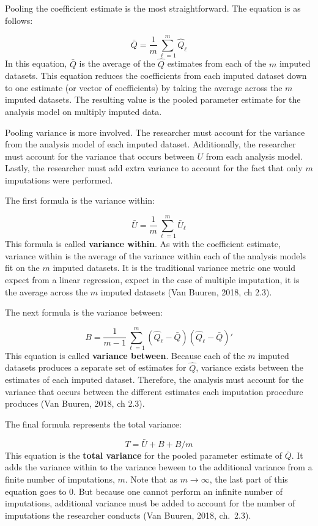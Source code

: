 \documentclass[12pt,oneside]{chicagocapstone}
\begin{document}
Pooling the coefficient estimate is the most straightforward. The
equation is as follows:

\[\bar Q = \frac{1}{m}\sum_{\ell=1}^m \hat Q_\ell\] In this equation,
\(\bar Q\) is the average of the \(\hat Q\) estimates from each of the
\(m\) imputed datasets. This equation reduces the coefficients from each
imputed dataset down to one estimate (or vector of coefficients) by
taking the average across the \(m\) imputed datasets. The resulting
value is the pooled parameter estimate for the analysis model on
multiply imputed data.

Pooling variance is more involved. The researcher must account for the
variance from the analysis model of each imputed dataset. Additionally,
the researcher must account for the variance that occurs between \(U\)
from each analysis model. Lastly, the researcher must add extra variance
to account for the fact that only \(m\) imputations were performed.

The first formula is the variance within:

\[ \bar U = \frac{1}{m}\sum_{\ell=1}^m \bar U_\ell\] This formula is
called \textbf{variance within}. As with the coefficient estimate,
variance within is the average of the variance within each of the
analysis models fit on the \(m\) imputed datasets. It is the traditional
variance metric one would expect from a linear regression, expect in the
case of multiple imputation, it is the average across the \(m\) imputed
datasets (Van Buuren, 2018, ch 2.3).

The next formula is the variance between:

\[B = \frac{1}{m-1}\sum_{\ell=1}^m (\hat Q_\ell-\bar Q)(\hat Q_\ell-\bar Q)'\]
This equation is called \textbf{variance between}. Because each of the
\(m\) imputed datasets produces a separate set of estimates for
\(\hat Q\), variance exists between the estimates of each imputed
dataset. Therefore, the analysis must account for the variance that
occurs between the different estimates each imputation procedure
produces (Van Buuren, 2018, ch 2.3).

The final formula represents the total variance:

\[T = \bar U + B + B/m\] This equation is the \textbf{total variance}
for the pooled parameter estimate of \(\bar Q\). It adds the variance
within to the variance beween to the additional variance from a finite
number of imputations, \(m\). Note that as \(m \rightarrow \infty\), the
last part of this equation goes to \(0\). But because one cannot perform
an infinite number of imputations, additional variance must be added to
account for the number of imputations the researcher conducts (Van
Buuren, 2018, ch.~2.3).
\end{document}
